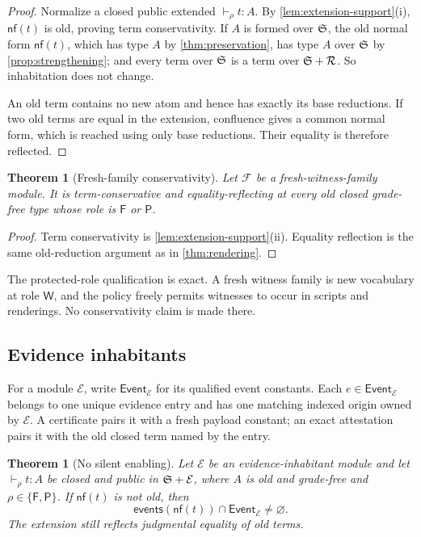 \documentclass[11pt]{article}
\numberwithin{equation}{section}
\theoremstyle{definition}
\theoremstyle{plain}
\newtheorem{theorem}[definition]{Theorem}
\theoremstyle{remark}
\newcommand{\Event}{\mathsf{Event}}
\newcommand{\Frm}{\mathsf F}
\newcommand{\Prs}{\mathsf P}
\newcommand{\Wit}{\mathsf W}
\newcommand{\events}{\mathsf{events}}
\newcommand{\nf}{\mathsf{nf}}
\begin{document}
\begin{proof}
Normalize a closed public extended \(\vdash_{\rho}t:A\).  By
\cref{lem:extension-support}(i), \(\nf(t)\) is old, proving term
conservativity.  If \(A\) is formed over \({\mathfrak S}\), the old normal
form \(\nf(t)\), which has type \(A\) by \cref{thm:preservation}, has type
\(A\) over \({\mathfrak S}\) by \cref{prop:strengthening}; and every term
over \({\mathfrak S}\) is a term over \({\mathfrak S}+\mathcal R\).  So
inhabitation does not change.

An old term contains no new atom and hence has exactly its base reductions.
If two old terms are equal in the extension, confluence gives a common normal
form, which is reached using only base reductions.  Their equality is
therefore reflected.
\end{proof}

\begin{theorem}[Fresh-family conservativity]\label{thm:fresh}
Let \(\mathcal F\) be a fresh-witness-family module.  It is term-conservative
and equality-reflecting at every old closed grade-free type whose role is
\(\Frm\) or \(\Prs\).
\end{theorem}

\begin{proof}
Term conservativity is \cref{lem:extension-support}(ii).  Equality reflection
is the same old-reduction argument as in \cref{thm:rendering}.
\end{proof}

The protected-role qualification is exact.  A fresh witness family is new
vocabulary at role \(\Wit\), and the policy freely permits witnesses to occur
in scripts and renderings.  No conservativity claim is made there.

\subsection{Evidence inhabitants}

For a module \(\mathcal E\), write \(\Event_{\mathcal E}\) for its qualified
event constants.  Each \(e\in\Event_{\mathcal E}\) belongs to one unique
evidence entry and has one matching indexed origin owned by \(\mathcal E\).
A certificate pairs it with a fresh payload constant; an exact attestation
pairs it with the old closed term named by the entry.

\begin{theorem}[No silent enabling]\label{thm:no-silent}
Let \(\mathcal E\) be an evidence-inhabitant module and let
\(\vdash_{\rho}t:A\) be closed and public in \({\mathfrak S}+\mathcal E\), where \(A\) is
old and grade-free and \(\rho\in\{\Frm,\Prs\}\).  If \(\nf(t)\) is not old,
then
\[
  \events(\nf(t))\cap\Event_{\mathcal E}\ne\varnothing.
\]
The extension still reflects judgmental equality of old terms.
\end{theorem}
\end{document}
